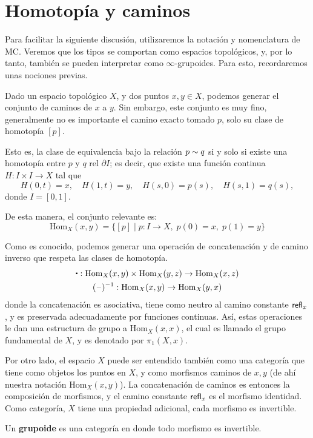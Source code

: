 \documentclass[../main.tex]{subfiles}
\begin{document}
\section{Homotop\'ia y caminos}
Para facilitar la siguiente discusi\'on, utilizaremos la notación y nomenclatura de MC.
Veremos que los tipos se comportan como espacios topológicos, y, por lo tanto, también se pueden interpretar como $\infty$-grupoides.
Para esto, recordaremos unas nociones previas.

Dado un espacio topológico $X$, y dos puntos $x,y \in X$, podemos generar el conjunto de caminos de $x$ a $y$.
Sin embargo, este conjunto es muy fino, generalmente no es importante el camino exacto tomado $p$, solo su clase de homotop\'ia $[p]$.

Esto es, la clase de equivalencia bajo la relación $p \sim q$ si y solo si existe una homotop\'ia entre $p$ y $q$ rel $\partial I$; es decir, que existe una función continua $H:I \times I \to X$ tal que
\[ H(0,t)=x, \quad H(1,t)=y,\quad H(s,0)=p(s),\quad H(s,1)=q(s), \]
donde $I=[0,1]$.

De esta manera, el conjunto relevante es:
\[\text{Hom}_X(x,y)=\{[p] \mid p:I \to X,\; p(0)=x,\; p(1)=y \} \]

Como es conocido, podemos generar una operaci\'on de concatenaci\'on y de camino inverso que respeta las clases de homotop\'ia.
\begin{gather*}
  \ct : \text{Hom}_X(x,y) \times \text{Hom}_X(y,z) \to \text{Hom}_X(x,z)\\
  (\blank)^{-1} : \text{Hom}_X(x,y) \to \text{Hom}_X(y,x)
\end{gather*}
donde la concatenaci\'on es asociativa, tiene como neutro al camino constante $\mathsf{refl}_{x}$, y es preservada adecuadamente por funciones continuas.
As\'i, estas operaciones le dan una estructura de grupo a $\text{Hom}_X(x,x)$, el cual es llamado el grupo fundamental de $X$, y es denotado por $\pi_1(X,x)$.

Por otro lado, el espacio $X$ puede ser entendido tambi\'en como una categor\'ia que tiene como objetos los puntos en $X$, y como morfismos caminos de $x,y$ (de ah\'i nuestra notación $\text{Hom}_X(x,y)$).
La concatenaci\'on de caminos es entonces la composición de morfismos, y el camino constante $\mathsf{refl}_{x}$ es el morfismo identidad.
Como categor\'ia, $X$ tiene una propiedad adicional, cada morfismo es invertible.

\begin{definition}
  Un \textbf{grupoide} es una categor\'ia en donde todo morfismo es invertible.
\end{definition}
\end{document}
